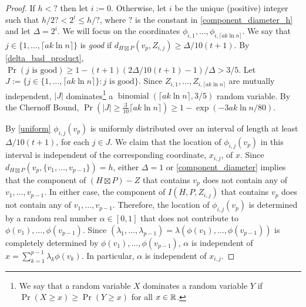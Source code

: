\documentclass{patmorin}
\renewcommand{\ge}{\geqslant}
\renewcommand{\le}{\leqslant}
\newcommand{\defin}[1]{\emph{\textcolor{brightmaroon}{#1}}}
\begin{document}
\begin{proof}
  If $h <?$ then let $i:=0$.  Otherwise, let $i$ be the unique (positive) integer such that $h/2?< 2^i \le h/?$, where $?$ is the constant in \cref{component_diameter_h} and let $\Delta=2^i$.  We will focus on the coordinates $\phi_{i,1},\ldots,\phi_{i,\lceil a k\ln n\rceil}$.  We say that $j\in\{1,\ldots,\lceil a k\ln n\rceil\}$ is \defin{good} if $d_{H\boxtimes P}(v_p,Z_{i,j})\ge \Delta/10(t+1)$.  By \cref{delta_bad_product},  $\Pr(\text{$j$ is good})\ge 1-(t+1)(2\Delta/10(t+1)-1)/\Delta > 3/5$. Let $J:=\{j\in\{1,\ldots,\lceil a k\ln n\rceil\}:\text{$j$ is good}\}$.  Since $Z_{i,1},\ldots,Z_{i,\lceil a k\ln n\rceil}$ are mutually independent, $|J|$ dominates\footnote{We say that a random variable $X$ dominates a random variable $Y$ if $\Pr(X\ge x)\ge\Pr(Y\ge x)$ for all $x\in\mathbb{R}$.} a $\operatorname{binomial}(\lceil a k\ln n\rceil,3/5)$ random variable. By the Chernoff Bound, $\Pr(|J|\ge \tfrac{3}{10}\lceil a k\ln n\rceil)\ge 1-\exp(-3ak\ln n/80)$.

  By \cref{uniform} $\phi_{i,j}(v_p)$ is uniformly distributed over an interval of length at least $\Delta/10(t+1)$, for each $j\in J$.  We claim that the location of $\phi_{i,j}(v_p)$ in this interval is independent of the corresponding coordinate, $x_{i,j}$, of $x$.
  Since $d_{H\boxtimes P}(v_p,\{v_1,\ldots,v_{p-1}\})= h$, either $\Delta=1$ or \cref{component_diameter} implies that the component of $(H\boxtimes P)-Z$ that contains $v_p$ does not contain any of $v_1,\ldots,v_{p-1}$. In either case, the component of $I(H,P,Z_{i,j})$ that contains $v_p$ does not contain any of $v_1,\ldots,v_{p-1}$.  Therefore, the location of $\phi_{i,j}(v_p)$ is determined by a random real number $\alpha\in[0,1]$ that does not contribute to $\phi(v_1),\ldots,\phi(v_{p-1})$.  Since $(\lambda_1,\ldots,\lambda_{p-1})=\lambda(\phi(v_1),\ldots,\phi(v_{p-1}))$ is completely determined by $\phi(v_1),\ldots,\phi(v_{p-1})$, $\alpha$ is independent of $x=\sum_{k=1}^{p-1}\lambda_k\phi(v_k)$.  In particular, $\alpha$ is independent of $x_{i,j}$.


\end{proof}
\end{document}
